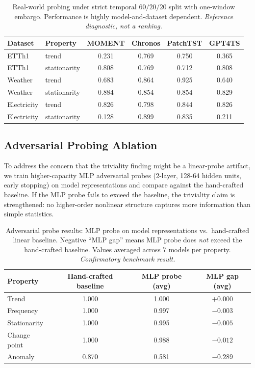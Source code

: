 \documentclass{article}
\begin{document}
\begin{table}[htbp]
\caption{Real-world probing under strict temporal $60/20/20$ split with one-window embargo. Performance is highly model-and-dataset dependent. \emph{Reference diagnostic, not a ranking.}}
\label{tab:realworld_temporal}
\centering
\small
\begin{tabular}{llcccc}
\toprule
Dataset & Property & MOMENT & Chronos & PatchTST & GPT4TS \\
\midrule
ETTh1       & trend         & 0.231 & 0.769 & 0.750 & 0.365 \\
ETTh1       & stationarity  & 0.808 & 0.769 & 0.712 & 0.808 \\
Weather     & trend         & 0.683 & 0.864 & 0.925 & 0.640 \\
Weather     & stationarity  & 0.884 & 0.854 & 0.854 & 0.829 \\
Electricity & trend         & 0.826 & 0.798 & 0.844 & 0.826 \\
Electricity & stationarity  & 0.128 & 0.899 & 0.835 & 0.211 \\
\bottomrule
\end{tabular}
\end{table}

\subsection{Adversarial Probing Ablation}
\label{sec:adversarial_probe}

To address the concern that the triviality finding might be a linear-probe artifact, we train higher-capacity MLP adversarial probes (2-layer, 128-64 hidden units, early stopping) on model representations and compare against the hand-crafted baseline. If the MLP probe fails to exceed the baseline, the triviality claim is strengthened: no higher-order nonlinear structure captures more information than simple statistics.

\begin{table}[tbp]
\caption{Adversarial probe results: MLP probe on model representations vs.\ hand-crafted linear baseline. Negative ``MLP gap'' means MLP probe does \emph{not} exceed the hand-crafted baseline. Values averaged across 7 models per property. \emph{Confirmatory benchmark result.}}
\label{tab:adversarial}
\centering
\begin{tabular}{lccc}
\toprule
Property & Hand-crafted baseline & MLP probe (avg) & MLP gap (avg) \\
\midrule
Trend & 1.000 & 1.000 & $+0.000$ \\
Frequency & 1.000 & 0.997 & $-0.003$ \\
Stationarity & 1.000 & 0.995 & $-0.005$ \\
Change point & 1.000 & 0.988 & $-0.012$ \\
Anomaly & 0.870 & 0.581 & $\mathbf{-0.289}$ \\
\bottomrule
\end{tabular}
\end{table}
\end{document}
